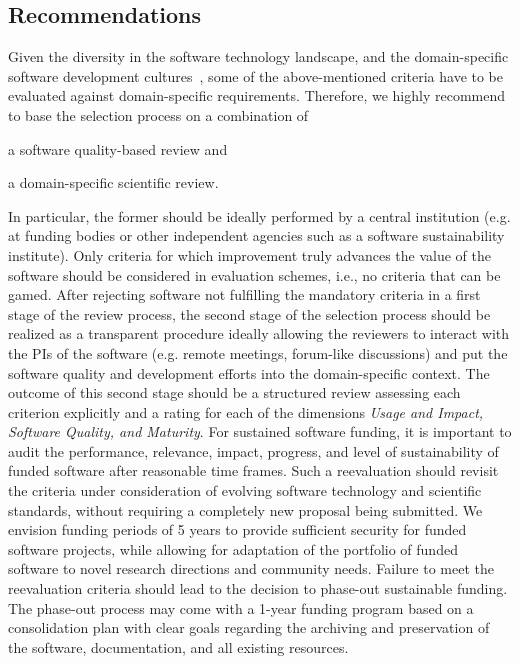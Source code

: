 \documentclass[a4paper,num-refs,numbers,sort&compress]{de-rse}
\begin{document}
\subsection{Recommendations}
Given the diversity in the software technology landscape, and the domain-specific software development cultures~\cite{johanson2018software}, some of the above-mentioned criteria have to be evaluated against domain-specific requirements. Therefore, we highly recommend to base the selection process on a combination of 
\begin{inlinelist}
    \item a software quality-based review and 
    \item a domain-specific scientific review.     
\end{inlinelist}
In particular, the former should be ideally performed by a central institution (e.g. at funding bodies or other independent agencies such as a software sustainability institute). Only criteria for which improvement truly advances the value of the software should be considered in evaluation schemes, i.e., no criteria that can be gamed.
After rejecting software not fulfilling the mandatory criteria in a first stage of the review process, the second stage of the selection process should be realized as a transparent procedure ideally allowing the reviewers to interact with the PIs of the software (e.g. remote meetings, forum-like discussions) and put the software quality and development efforts into the domain-specific context. The outcome of this second stage should be a structured review assessing each criterion explicitly and a rating for each of the dimensions \emph{Usage and Impact, Software Quality, and Maturity}.
For sustained software funding, it is important to audit the performance, relevance, impact, progress, and level of sustainability of funded software after reasonable time frames. Such a reevaluation should revisit the criteria under consideration of evolving software technology and scientific standards, without requiring a completely new proposal being submitted. We envision funding periods of 5 years to provide sufficient security for funded software projects, while allowing for adaptation of the portfolio of funded software to novel research directions and community needs.
Failure to meet the reevaluation criteria should lead to the decision to phase-out sustainable funding. The phase-out process may come with a 1-year funding program based on a consolidation plan with clear goals regarding the archiving and preservation of the software, documentation, and all existing resources.
\end{document}
